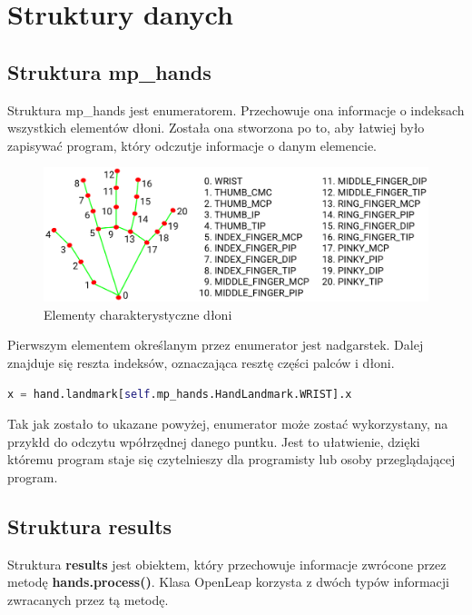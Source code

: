 \section{Struktury danych}

\subsection{Struktura mp\_hands}

\quad Struktura mp\_hands jest enumeratorem. Przechowuje ona informacje o indeksach wszystkich elementów dłoni. Została ona stworzona po to, aby łatwiej było zapisywać program, który odczutje informacje o danym elemencie. 

\begin{figure}[H]
    \begin{center}
        \includegraphics[width=15cm]{../images/hand_landmarks.png}
        \caption{Elementy charakterystyczne dłoni}
    \end{center}
\end{figure}

\quad Pierwszym elementem określanym przez enumerator jest nadgarstek. Dalej znajduje się reszta indeksów, oznaczająca resztę części palców i dłoni.  

\begin{lstlisting}[caption={Przykładowe wykorzystanie \textbf{mp\_hands}},captionpos=b,language=python]
    x = hand.landmark[self.mp_hands.HandLandmark.WRIST].x
\end{lstlisting}

\quad Tak jak zostało to ukazane powyżej, enumerator może zostać wykorzystany, na przykłd do odczytu wpółrzędnej danego puntku. Jest to ułatwienie, dzięki któremu program staje się czytelnieszy dla programisty lub osoby przeglądającej program. 

\subsection{Struktura results}

\quad Struktura \textbf{results} jest obiektem, który przechowuje informacje zwrócone przez metodę \textbf{hands.process()}. Klasa OpenLeap korzysta z dwóch typów informacji zwracanych przez tą metodę. 

